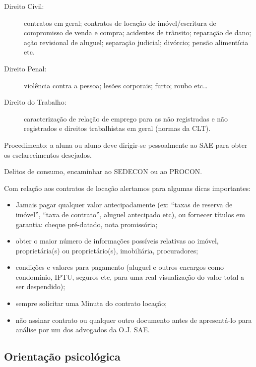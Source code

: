 \begin{description}
    \item[Direito Civil:] contratos em geral; contratos de locação de
        imóvel/escritura de compromisso de venda e compra; acidentes de
        trânsito; reparação de dano; ação revisional de aluguel; separação
        judicial; divórcio; pensão alimentícia etc.

    \item[Direito Penal:] violência contra a pessoa; lesões corporais; furto;
        roubo etc{\dots}

    \item[Direito do Trabalho:] caracterização de relação de emprego para as
        não registradas e não registrados e direitos trabalhistas em geral
        (normas da CLT).
\end{description}

Procedimento: a aluna ou aluno deve dirigir-se pessoalmente ao SAE para obter
os esclarecimentos desejados.

Delitos de consumo, encaminhar ao SEDECON ou ao PROCON.

Com relação aos contratos de locação alertamos para algumas dicas importantes:

\begin{itemize}
    \item  Jamais pagar qualquer valor antecipadamente (ex: ``taxas de reserva
        de imóvel'', ``taxa de contrato'', aluguel antecipado etc), ou fornecer
        títulos em garantia: cheque pré-datado, nota promissória;

    \item  obter o maior número de informações possíveis relativas ao imóvel,
        proprietária(s) ou proprietário(s), imobiliária, procuradores;

    \item  condições e valores para pagamento (aluguel e outros encargos como
        condomínio, IPTU, seguros etc, para uma real visualização do valor
        total a ser despendido);

    \item  sempre solicitar uma Minuta do contrato locação;

    \item  não assinar contrato ou qualquer outro documento antes de
        apresentá-lo para análise por um dos advogados da O.J. SAE.
\end{itemize}

\subsection{Orientação psicológica}

